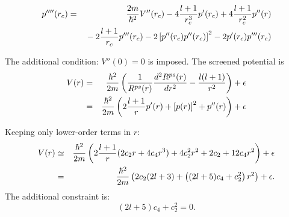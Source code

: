 \begin{eqnarray}
p''''(r_c) & = & {2m\over\hbar^2}V''(r_c) - 4 {l+1\over r^3_c}p'(r_c)
                 + 4{l+1\over r^2_c}p''(r) \nonumber \\ & & \mbox{} 
            - 2{l+1\over r_c}p'''(r_c)
           - 2 \left[p''(r_c)p''(r_c)\right]^2 -2 p'(r_c)p'''(r_c)
\end{eqnarray}

The additional condition: $V''(0)=0$ is imposed. 
The screened potential is
\begin{eqnarray}
V(r)&=&{\hbar^2\over2m}\left({1\over R^{ps}(r)}{d^2R^{ps}(r)\over dr^2} 
     - {l(l+1)\over r^2}\right)+\epsilon \\
    &=&{\hbar^2\over2m}\left( 2{l+1\over r} p'(r)+\left[p(r)\right]^2+p''(r)
       \right)+\epsilon
\end{eqnarray}

Keeping only lower-order terms in $r$:
\begin{eqnarray}
V(r) &\simeq&{\hbar^2\over2m}\left( 2{l+1\over r} (2c_2r + 4c_4r^3) 
               + 4c_2^2r^2 + 2c_2 + 12c_4r^2\right) + \epsilon \\
     &   =  & {\hbar^2\over2m}\left( 2c_2(2l+3) + 
              \left((2l+5)c_4+c_2^2\right) r^2\right)+ \epsilon .
\end{eqnarray}
The additional constraint is:
\begin{equation}
(2l+5)c_4+c_2^2=0.
\end{equation}



